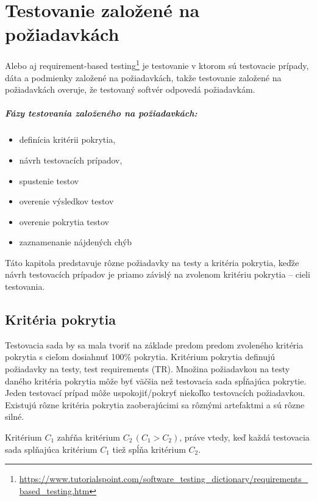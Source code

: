 \chapter{Testovanie založené na požiadavkách}
\label{requirements_based_testing}
Alebo aj requirement-based testing\footnote{\url{https://www.tutorialspoint.com/software_testing_dictionary/requirements_based_testing.htm}} je testovanie v ktorom sú testovacie prípady, dáta a podmienky založené na požiadavkách, takže testovanie založené na požiadavkách overuje, že testovaný softvér odpovedá požiadavkám.

\paragraph{Fázy testovania založeného na požiadavkách:}
\begin{itemize}
	\item definícia kritérii pokrytia,
	\item návrh testovacích prípadov,
	\item spustenie testov
	\item overenie výsledkov testov
	\item overenie pokrytia testov
	\item zaznamenanie nájdených chýb
\end{itemize}

Táto kapitola predstavuje rôzne požiadavky na testy a kritéria pokrytia, keďže návrh testovacích prípadov je priamo závislý na zvolenom kritériu pokrytia -- cieli testovania.


\section{Kritéria pokrytia}
\label{krietria_pokrytia}
Testovacia sada by sa mala tvoriť na základe predom predom zvoleného kritéria pokrytia s cieľom dosiahnuť 100\% pokrytia. 
Kritérium pokrytia definujú požiadavky na testy, test requirements (TR).
Množina požiadavkou na testy daného kritéria pokrytia môže byť väčšia než testovacia sada spĺňajúca pokrytie.
Jeden testovací prípad môže uspokojiť/pokryť niekoľko testovacích požiadavkou.
Existujú rôzne kritéria pokrytia zaoberajúcimi sa rôznými artefaktmi a sú rôzne silné.

\begin{definition}
Kritérium $C_1$ zahŕňa kritérium $C_2 \,(C_1 > C_2)$, práve vtedy, keď každá testovacia sada splňajúca kritérium $C_1$ tiež spĺňa kritérium $C_2$.
\end{definition}

